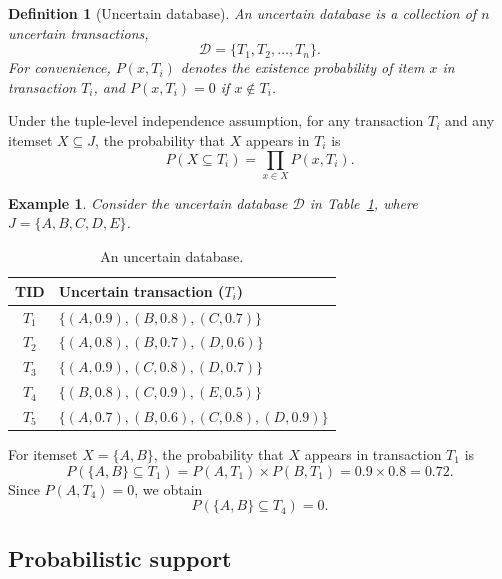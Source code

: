 \documentclass[10pt,letterpaper]{article}
\newtheorem{definition}{Definition}[section]
\newtheorem{example}{Example}[section]
\newcounter{definition}
\newcounter{example}
\begin{document}
\begin{definition}[Uncertain database]
\label{def:database}
An uncertain database is a collection of $n$ uncertain transactions,
\begin{equation}
\mathcal{D} = \{T_1, T_2, \ldots, T_n\}.
\end{equation}
For convenience, $P(x,T_i)$ denotes the existence probability of item $x$ in transaction $T_i$, and $P(x,T_i)=0$ if $x \notin T_i$.
\end{definition}

Under the tuple-level independence assumption, for any transaction $T_i$ and any itemset $X \subseteq J$, the probability that $X$ appears in $T_i$ is
\begin{equation}
P(X \subseteq T_i) = \prod_{x \in X} P(x,T_i).
\label{eq:itemset_probability}
\end{equation}

\begin{example}
\label{ex:uncertain-db}
Consider the uncertain database $\mathcal{D}$ in Table~\ref{tab:uncertain_db}, where $J=\{A,B,C,D,E\}$.
\end{example}

\begin{table}[H]
\caption{An uncertain database.}
\label{tab:uncertain_db}
\centering
\begin{tabular}{c l}
\hline
\textbf{TID} & \textbf{Uncertain transaction ($T_i$)} \\
\hline
$T_1$ & $\{(A,0.9),(B,0.8),(C,0.7)\}$ \\
$T_2$ & $\{(A,0.8),(B,0.7),(D,0.6)\}$ \\
$T_3$ & $\{(A,0.9),(C,0.8),(D,0.7)\}$ \\
$T_4$ & $\{(B,0.8),(C,0.9),(E,0.5)\}$ \\
$T_5$ & $\{(A,0.7),(B,0.6),(C,0.8),(D,0.9)\}$ \\
\hline
\end{tabular}
\end{table}

For itemset $X=\{A,B\}$, the probability that $X$ appears in transaction $T_1$ is
\begin{equation}
P(\{A,B\}\subseteq T_1) = P(A,T_1) \times P(B,T_1) = 0.9 \times 0.8 = 0.72.
\end{equation}
Since $P(A,T_4)=0$, we obtain
\begin{equation}
P(\{A,B\}\subseteq T_4) = 0.
\end{equation}

\subsection*{Probabilistic support}
\label{subsec:prob_support}
\end{document}
